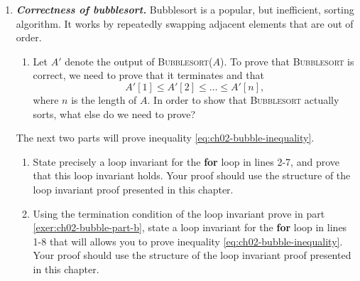 \documentclass[Chapter02]{subfiles}
\begin{document}
\begin{enumerate}[leftmargin=\labelsep,label={\textbf{\thesection-\arabic*}}]
\begin{enumerate}
		\end{enumerate}

		\item \textbf{\textit{Correctness of bubblesort.}} Bubblesort is a popular, but inefficient, sorting algorithm. It works by repeatedly swapping adjacent elements that are out of order.

		\begin{algorithm}[H]

		\end{algorithm}
		\begin{enumerate}
			\item Let $A'$ denote the output of \textsc{Bubblesort($A$)}. To prove that \textsc{Bubblesort} is correct, we need to prove that it terminates and that
			\begin{equation}
				A'[1] \leq A'[2] \leq \dots \leq A'[n], \label{eq:ch02-bubble-inequality}
			\end{equation}
			where $n$ is the length of $A$. In order to show that \textsc{Bubblesort} actually sorts, what else do we need to prove?
			\begin{answer}
				
			\end{answer}
		\end{enumerate}

		The next two parts will prove inequality \ref{eq:ch02-bubble-inequality}.

		\begin{enumerate}[resume]
			\item State precisely a loop invariant for the \textbf{for} loop in lines 2-7, and prove that this loop invariant holds. Your proof should use the structure of the loop invariant proof presented in this chapter. \label{exer:ch02-bubble-part-b}
			\begin{answer}
				
			\end{answer}
			
			\item Using the termination condition of the loop invariant prove in part \ref{exer:ch02-bubble-part-b}, state a loop invariant for the \textbf{for} loop in lines 1-8 that will allows you to prove inequality \ref{eq:ch02-bubble-inequality}. Your proof should use the structure of the loop invariant proof presented in this chapter.
			\begin{answer}
				

\end{answer}
\end{enumerate}
\end{enumerate}
\end{document}
